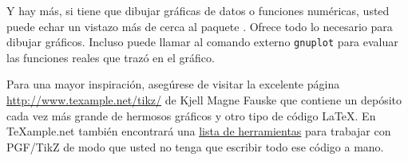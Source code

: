 Y hay más, si tiene que dibujar gráficas de datos o funciones numéricas, usted puede echar un vistazo más de cerca al paquete . Ofrece todo lo necesario para dibujar gráficos. Incluso puede llamar al comando externo \texttt{gnuplot} para evaluar las funciones reales que trazó en el gráfico.

Para una mayor inspiración, asegúrese de visitar la excelente página \linebreak \url{http://www.texample.net/tikz/} de Kjell Magne Fauske que contiene un depósito cada vez más grande de hermosos gráficos y otro tipo de código \LaTeX{}. En \TeX{}ample.net también encontrará una  \href{http://www.texample.net/tikz/resources/#tools-that-generate-pgftikz-code}{lista de herramientas} para trabajar con PGF/TikZ de modo que usted no tenga que escribir todo ese código a mano.

